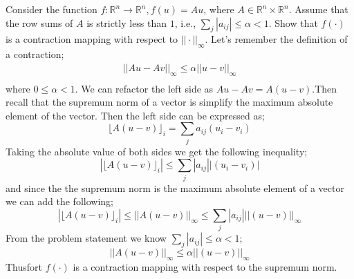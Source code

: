 \documentclass{article}
\begin{document}
\begin{tcolorbox}[colback=blue!5!white,colframe=blue!75!black,title=Question 4]
    Consider the function $f: \mathbb{R}^n \rightarrow \mathbb{R}^n, f(u) = Au$, where $A \in \mathbb{R}^n \times \mathbb{R}^n$.
    Assume that the row sums of $A$ is strictly less than $1$, i.e., $\sum_{j}|a_{ij}| \leq \alpha < 1$. Show that $f(\cdot)$ is a contraction
    mapping with respect to $||\cdot||_{\infty}$.
    \tcblower
    Let's remember the definition of a contraction;
    \begin{equation}
        \begin{split}
            ||Au - Av||_\infty \leq \alpha ||u - v||_\infty\\
    \end{split}
    \end{equation}
    where $0 \leq \alpha < 1$. We can refactor the left side as $Au - Av = A(u-v)$.Then recall that the supremum norm
    of a vector is simplify the maximum absolute element of the vector. 
    Then the left side can be expressed as;
    \begin{equation}
        \lfloor A(u - v) \rfloor_i = \sum_{j} a_{ij} (u_i - v_i)
    \end{equation}
    Taking the absolute value of both sides we get the following inequality;
    \begin{equation}
        | \lfloor A(u - v) \rfloor_i| \leq \sum_{j} |a_{ij}| |(u_i - v_i)|
    \end{equation}
    and since the the supremum norm is the maximum absolute element of a vector we can add the following;
    \begin{equation}
        | \lfloor A(u - v) \rfloor_i| \leq ||A(u-v)||_\infty \leq \sum_{j} |a_{ij}| ||(u - v)||_\infty 
    \end{equation}
    From the problem statement we know $\sum_{j}|a_{ij}| \leq \alpha < 1$;
    \begin{equation}
        ||A(u-v)||_\infty \leq \alpha ||(u - v)||_\infty 
    \end{equation}
    Thusfort $f(\cdot)$ is a contraction mapping with respect to the supremum norm.
\end{tcolorbox}
\end{document}
